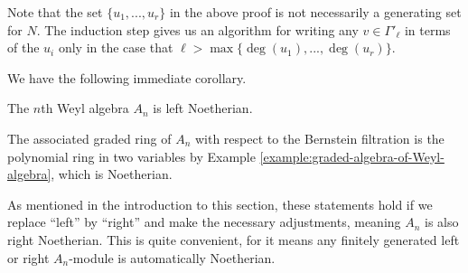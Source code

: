 Note that the set $\{u_1,...,u_r\}$ in the above proof is not necessarily a generating set for $N$. The induction step gives us an algorithm for writing any $v \in \Gamma'_\ell$ in terms of the $u_i$ only in the case that $\ell > \max\{\deg(u_1),...,\deg(u_r)\}$.

We have the following immediate corollary.
\begin{cor}\label{cor:Weyl-algebra-Noetherian}
	The $n$th Weyl algebra $A_n$ is left Noetherian.
\end{cor}
\begin{prf}
	The associated graded ring of $A_n$ with respect to the Bernstein filtration is the polynomial ring in two variables by Example \ref{example:graded-algebra-of-Weyl-algebra}, which is Noetherian.
\end{prf}
As mentioned in the introduction to this section, these statements hold if we replace ``left'' by ``right'' and make the necessary adjustments, meaning $A_n$ is also right Noetherian. This is quite convenient, for it means any finitely generated left or right $A_n$-module is automatically Noetherian.

